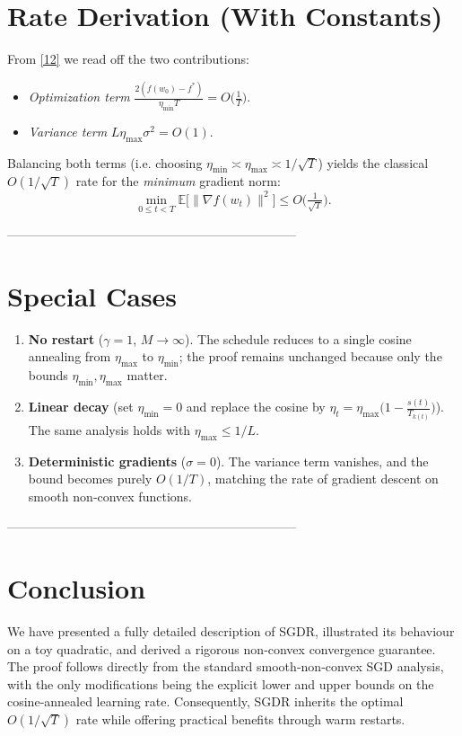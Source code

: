 \documentclass{article}
\newcommand{\EE}{\mathbb{E}}
\begin{document}
\section*{Rate Derivation (With Constants)}
From \eqref{12} we read off the two contributions:

\begin{itemize}
\item \emph{Optimization term} $\displaystyle
  \frac{2(f(w_{0})-f^{*})}{\eta_{\min}T}=O\!\big(\tfrac{1}{T}\big)$.
\item \emph{Variance term} $\displaystyle L\eta_{\max}\sigma^{2}=O(1)$.
\end{itemize}

Balancing both terms (i.e. choosing $\eta_{\min}\asymp\eta_{\max}
\asymp 1/\sqrt{T}$) yields the classical $O(1/\sqrt{T})$ rate for the
\emph{minimum} gradient norm:
\[
\min_{0\le t<T}\EE\!\big[\|\nabla f(w_{t})\|^{2}\big]
\le O\!\big(\tfrac{1}{\sqrt{T}}\big).
\]

---------------------------------------------------------------------

\section*{Special Cases}
\begin{enumerate}
\item \textbf{No restart} ($\gamma=1$, $M\to\infty$).  The schedule reduces to a
single cosine annealing from $\eta_{\max}$ to $\eta_{\min}$; the proof
remains unchanged because only the bounds $\eta_{\min},\eta_{\max}$ matter.
\item \textbf{Linear decay} (set $\eta_{\min}=0$ and replace the cosine by
$\eta_{t}= \eta_{\max}\bigl(1-\frac{s(t)}{T_{k(t)}}\bigr)$).  The same
analysis holds with $\eta_{\max}\le1/L$.
\item \textbf{Deterministic gradients} ($\sigma=0$).  The variance term vanishes,
and the bound becomes purely $O(1/T)$, matching the rate of gradient descent
on smooth non‑convex functions.
\end{enumerate}

---------------------------------------------------------------------

\section*{Conclusion}
We have presented a fully detailed description of SGDR, illustrated its
behaviour on a toy quadratic, and derived a rigorous non‑convex convergence
guarantee.  The proof follows directly from the standard smooth‑non‑convex SGD
analysis, with the only modifications being the explicit lower and upper
bounds on the cosine‑annealed learning rate.  Consequently, SGDR inherits the
optimal $O(1/\sqrt{T})$ rate while offering practical benefits through warm
restarts.
\end{document}
